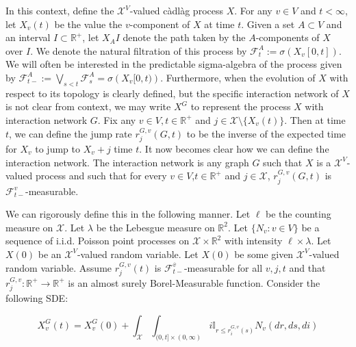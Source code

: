 \documentclass[12pt]{article}
\newcommand{\mb}{\mathbb}
\newcommand{\mc}{\mathcal}
\newcommand{\ra}{\rightarrow}
\newcommand{\ov}{\overline}
\newcommand{\ind}{\hspace{24pt}}
\newcommand{\defeq}{:=}								%
\newcommand{\sta}{\mc{X}}							%
\newcommand{\cl}[1]{\ov{#1}}						%
\newcommand{\Xf}{X}									%
\newcommand{\poiss}{N}								%
\newcommand{\leb}{\lambda}							%
\newcommand{\Sm}{\ell}								%
\newcommand{\rate}{r}								%
\newcommand{\F}{\mc{F}}								%
\newcommand{\poissv}[1]{_{#1}}						%
\newcommand{\vind}[1]{_{#1}}						%
\newcommand{\tme}[1]{(#1)}							%
\newcommand{\tmi}[1]{#1}							%
\newcommand{\gind}[1]{^{#1}}						%
\newcommand{\vpara}[1]{^{#1}}						%
\newcommand{\stpara}[1]{_{#1}}						%
\newcommand{\tpara}[1]{_{#1}}						%
\newcommand{\gvpara}[2]{^{#1,#2}}					%
\begin{document}
In this context, define the \(\sta^V\)-valued c\`adl\`ag process \(\Xf\). For any \(v \in V\) and \(t < \infty\), let \(\Xf\vind{v}\tme{t}\) be the value the \(v\)-component of \(\Xf\) at time \(t\). Given a set \(A\subset V\) and an interval \(I \subset \mb{R}^+\), let \(\Xf\vind{A}\tmi{I}\) denote the path taken by the \(A\)-components of \(\Xf\) over \(\tmi{I}\). We denote the natural filtration of this process by \(\F\vpara{A}\tpara{t} \defeq \sigma \left(\Xf\vind{v}\tmi{[0,t]}\right)\). We will often be interested in the predictable sigma-algebra of the process given by \(\F\vpara{A}\tpara{t-} \defeq \bigvee_{s < t} \F\vpara{A}\tpara{s} = \sigma\left(\Xf\vind{v}\tmi{[0,t)}\right)\). Furthermore, when the evolution of \(\Xf\) with respect to its topology is clearly defined, but the specific interaction network of \(\Xf\) is not clear from context, we may write \(\Xf\gind{G}\) to represent the process \(\Xf\) with interaction network \(G\). Fix any \(v \in V,t \in \mb{R}^+\) and \(j \in \sta\setminus\{\Xf\vind{v}\tme{t}\}\). Then at time \(t\), we can define the jump rate \(\rate\gvpara{G}{v}\stpara{j}(G,t)\) to be the inverse of the expected time for \(\Xf\vind{v}\) to jump to \(\Xf\vind{v} + j\) time \(t\). It now becomes clear how we can define the interaction network. The interaction network is any graph \(G\) such that \(\Xf\) is a \(\sta^V\)-valued process and such that for every \(v \in V\),\(t\in \mb{R}^+\) and \(j \in \sta\), \(\rate\gvpara{G}{v}\stpara{j}(G,t)\) is \(\F\vpara{v}\tpara{t-}\)-measurable. 

\ind We can rigorously define this in the following manner. Let \(\Sm\) be the counting measure on \(\sta\). Let \(\leb\) be the Lebesgue measure on \(\mb{R}^2\). Let \(\{\poiss\poissv{v}:v \in V\}\) be a sequence of i.i.d. Poisson point processes on \(\sta\times \mb{R}^2\) with intensity \(\Sm\times \leb\). Let \(\Xf\tme{0}\) be an \(\sta^V\)-valued random variable. Let \(\Xf\tme{0}\) be some given \(\sta^V\)-valued random variable. Assume \(\rate\gvpara{G}{v}\stpara{j}(t)\) is \(\F\vpara{\cl{v}}\tpara{t-}\)-measurable for all \(v,j,t\) and that \(\rate\gvpara{G}{v}\stpara{j}:\mb{R}^+ \ra\mb{R}^+\) is an almost surely Borel-Measurable function. Consider the following SDE:

\begin{equation}
\Xf\gind{G}\vind{v}\tme{t} = \Xf\gind{G}\vind{v}\tme{0} + \int_{\sta}\int_{(0,t]\times (0,\infty)} i\mb{I}_{r \leq \rate\gvpara{G}{v}\stpara{i}(s)} \poiss\poissv{v}\left(dr,ds,di\right)
\label{p::Xf}
\end{equation}
\end{document}
